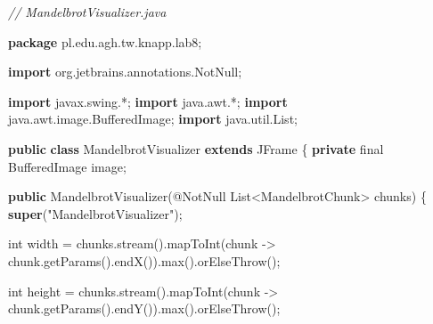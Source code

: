 \documentclass[11pt]{article}
\newenvironment{Shaded}{}{}
\newcommand{\KeywordTok}[1]{\textcolor[rgb]{0.00,0.44,0.13}{\textbf{{#1}}}}
\newcommand{\DataTypeTok}[1]{\textcolor[rgb]{0.56,0.13,0.00}{{#1}}}
\newcommand{\StringTok}[1]{\textcolor[rgb]{0.25,0.44,0.63}{{#1}}}
\newcommand{\CommentTok}[1]{\textcolor[rgb]{0.38,0.63,0.69}{\textit{{#1}}}}
\newcommand{\FunctionTok}[1]{\textcolor[rgb]{0.02,0.16,0.49}{{#1}}}
\newcommand{\NormalTok}[1]{{#1}}
\newcommand{\ImportTok}[1]{{#1}}
\newcommand{\OperatorTok}[1]{\textcolor[rgb]{0.40,0.40,0.40}{{#1}}}
\newcommand{\BuiltInTok}[1]{{#1}}
\newcommand{\AttributeTok}[1]{\textcolor[rgb]{0.49,0.56,0.16}{{#1}}}
\begin{document}
\begin{Shaded}
\begin{Highlighting}[]
\CommentTok{// MandelbrotVisualizer.java}

\KeywordTok{package}\ImportTok{ pl}\OperatorTok{.}\ImportTok{edu}\OperatorTok{.}\ImportTok{agh}\OperatorTok{.}\ImportTok{tw}\OperatorTok{.}\ImportTok{knapp}\OperatorTok{.}\ImportTok{lab8}\OperatorTok{;}

\KeywordTok{import} \ImportTok{org}\OperatorTok{.}\ImportTok{jetbrains}\OperatorTok{.}\ImportTok{annotations}\OperatorTok{.}\ImportTok{NotNull}\OperatorTok{;}

\KeywordTok{import} \ImportTok{javax}\OperatorTok{.}\ImportTok{swing}\OperatorTok{.*;}
\KeywordTok{import} \ImportTok{java}\OperatorTok{.}\ImportTok{awt}\OperatorTok{.*;}
\KeywordTok{import} \ImportTok{java}\OperatorTok{.}\ImportTok{awt}\OperatorTok{.}\ImportTok{image}\OperatorTok{.}\ImportTok{BufferedImage}\OperatorTok{;}
\KeywordTok{import} \ImportTok{java}\OperatorTok{.}\ImportTok{util}\OperatorTok{.}\ImportTok{List}\OperatorTok{;}

\KeywordTok{public} \KeywordTok{class}\NormalTok{ MandelbrotVisualizer }\KeywordTok{extends} \BuiltInTok{JFrame} \OperatorTok{\{}
    \KeywordTok{private} \DataTypeTok{final} \BuiltInTok{BufferedImage}\NormalTok{ image}\OperatorTok{;}

    \KeywordTok{public} \FunctionTok{MandelbrotVisualizer}\OperatorTok{(}\AttributeTok{@NotNull} \BuiltInTok{List}\OperatorTok{\textless{}}\NormalTok{MandelbrotChunk}\OperatorTok{\textgreater{}}\NormalTok{ chunks}\OperatorTok{)} \OperatorTok{\{}
        \KeywordTok{super}\OperatorTok{(}\StringTok{"MandelbrotVisualizer"}\OperatorTok{);}

        \DataTypeTok{int}\NormalTok{ width }\OperatorTok{=}\NormalTok{ chunks}\OperatorTok{.}\FunctionTok{stream}\OperatorTok{().}\FunctionTok{mapToInt}\OperatorTok{(}\NormalTok{chunk }\OperatorTok{{-}\textgreater{}}
\NormalTok{                chunk}\OperatorTok{.}\FunctionTok{getParams}\OperatorTok{().}\FunctionTok{endX}\OperatorTok{()).}\FunctionTok{max}\OperatorTok{().}\FunctionTok{orElseThrow}\OperatorTok{();}

        \DataTypeTok{int}\NormalTok{ height }\OperatorTok{=}\NormalTok{ chunks}\OperatorTok{.}\FunctionTok{stream}\OperatorTok{().}\FunctionTok{mapToInt}\OperatorTok{(}\NormalTok{chunk }\OperatorTok{{-}\textgreater{}}
\NormalTok{                chunk}\OperatorTok{.}\FunctionTok{getParams}\OperatorTok{().}\FunctionTok{endY}\OperatorTok{()).}\FunctionTok{max}\OperatorTok{().}\FunctionTok{orElseThrow}\OperatorTok{();}


\end{Highlighting}
\end{Shaded}
\end{document}
